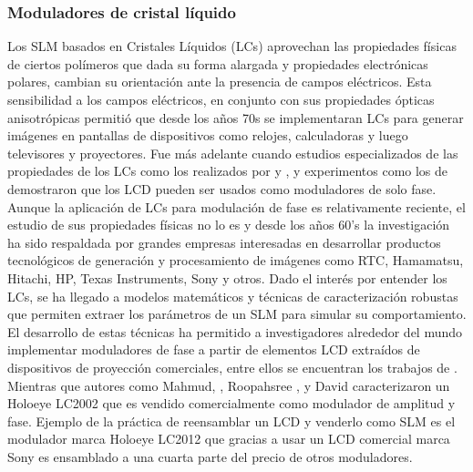 \subsubsection{Moduladores de cristal líquido}
Los SLM basados en Cristales Líquidos (\acrshort{LCs}) aprovechan las propiedades
físicas de ciertos polímeros que dada su forma alargada y propiedades
electrónicas polares, cambian su orientación ante la presencia de
campos eléctricos.  Esta sensibilidad a los campos eléctricos, en
conjunto con sus propiedades ópticas anisotrópicas permitió que desde
los años 70s se implementaran LCs para generar imágenes en pantallas de
dispositivos como relojes, calculadoras y luego televisores y
proyectores. Fue más adelante cuando estudios especializados de las
propiedades de los LCs como los realizados por
 y , y experimentos como los de
 demostraron que los LCD pueden ser usados
como moduladores de solo fase. Aunque la aplicación de LCs para
modulación de fase es relativamente reciente, el estudio de sus
propiedades físicas no lo es y desde los años 60’s la investigación ha
sido respaldada por grandes empresas interesadas en desarrollar
productos tecnológicos de generación y procesamiento de imágenes como
RTC, Hamamatsu, Hitachi, HP, Texas Instruments, Sony y otros. Dado
el interés por entender los LCs, se ha llegado a modelos matemáticos y  técnicas de  
caracterización robustas que permiten extraer los parámetros de un SLM para
 simular su comportamiento. 
El desarrollo de estas técnicas ha permitido a investigadores 
alrededor del mundo implementar moduladores de fase a
partir de elementos LCD extraídos de dispositivos de proyección
comerciales, entre ellos se encuentran los trabajos de
. Mientras
que autores como Mahmud, , Roopahsree
, y David 
caracterizaron un Holoeye LC2002 que es vendido comercialmente como
modulador de amplitud y fase.
Ejemplo de la práctica de reensamblar un LCD y venderlo como SLM es el
modulador marca Holoeye LC2012 que gracias a usar un LCD comercial
marca Sony es ensamblado a una cuarta parte del precio de otros
moduladores. 

